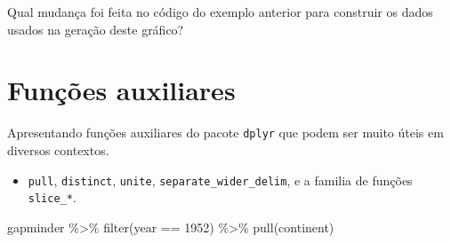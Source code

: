 \documentclass[
  portuguese,
  letterpaper,
  DIV=11,
  numbers=noendperiod]{scrreprt}
\newenvironment{Shaded}{\begin{snugshade}}{\end{snugshade}}
\newcommand{\DecValTok}[1]{\textcolor[rgb]{0.68,0.00,0.00}{#1}}
\newcommand{\FunctionTok}[1]{\textcolor[rgb]{0.28,0.35,0.67}{#1}}
\newcommand{\NormalTok}[1]{\textcolor[rgb]{0.00,0.23,0.31}{#1}}
\newcommand{\SpecialCharTok}[1]{\textcolor[rgb]{0.37,0.37,0.37}{#1}}
\providecommand{\tightlist}{%
  \setlength{\itemsep}{0pt}\setlength{\parskip}{0pt}}
\theoremstyle{definition}
\theoremstyle{remark}
\begin{document}
\begin{tcolorbox}[enhanced jigsaw, leftrule=.75mm, opacitybacktitle=0.6, colback=white, coltitle=black, colframe=quarto-callout-tip-color-frame, titlerule=0mm, left=2mm, opacityback=0, breakable, bottomtitle=1mm, toprule=.15mm, title=\textcolor{quarto-callout-tip-color}{\faLightbulb}\hspace{0.5em}{Desafio}, colbacktitle=quarto-callout-tip-color!10!white, arc=.35mm, rightrule=.15mm, bottomrule=.15mm, toptitle=1mm]

Qual mudança foi feita no código do exemplo anterior para construir os
dados usados na geração deste gráfico?

\end{tcolorbox}

\section{Funções auxiliares}\label{funuxe7uxf5es-auxiliares}

Apresentando funções auxiliares do pacote \texttt{dplyr} que podem ser
muito úteis em diversos contextos.

\begin{itemize}
\tightlist
\item
  \texttt{pull}, \texttt{distinct}, \texttt{unite},
  \texttt{separate\_wider\_delim}, e a familia de funções
  \texttt{slice\_*}.
\end{itemize}

\begin{Shaded}
\begin{Highlighting}[]
\NormalTok{gapminder }\SpecialCharTok{\%\textgreater{}\%} 
  \FunctionTok{filter}\NormalTok{(year }\SpecialCharTok{==} \DecValTok{1952}\NormalTok{) }\SpecialCharTok{\%\textgreater{}\%} 
  \FunctionTok{pull}\NormalTok{(continent)}
\end{Highlighting}
\end{Shaded}
\end{document}
